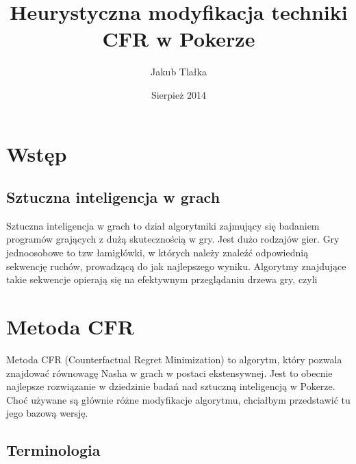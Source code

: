 \documentclass[licencjacka]{pracamgr}
\author{Jakub Tlałka}
\title{Heurystyczna modyfikacja techniki CFR w Pokerze}
\date{Sierpież 2014}
\begin{document}
\maketitle

\begin{abstract}
\end{abstract}

\tableofcontents

\chapter{Wstęp}

\section{Sztuczna inteligencja w grach}

Sztuczna inteligencja w grach to dział algorytmiki zajmujący się badaniem programów grających
z dużą skutecznością w gry. Jest dużo rodzajów gier. Gry jednoosobowe to tzw łamigłówki, w których
należy znaleźć odpowiednią sekwencję ruchów, prowadzącą do jak najlepszego wyniku. Algorytmy znajdujące
takie sekwencje opierają się na efektywnym przeglądaniu drzewa gry, czyli 


\chapter{Metoda CFR}

Metoda CFR (Counterfactual Regret Minimization) to algorytm, który pozwala znajdować równowagę Nasha
w grach w postaci ekstensywnej. Jest to obecnie najlepsze rozwiązanie w dziedzinie badań nad
sztuczną inteligencją w Pokerze. Choć używane są głównie różne modyfikacje algorytmu, chciałbym
przedstawić tu jego bazową wersję.

\section{Terminologia}
\end{document}
